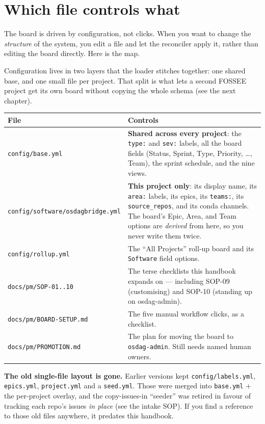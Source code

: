 \documentclass[11pt,a4paper]{report}
\newcommand{\code}[1]{\texttt{#1}}
\begin{document}
\chapter{Which file controls what}

The board is driven by configuration, not clicks. When you want to change the
\emph{structure} of the system, you edit a file and let the reconciler apply it,
rather than editing the board directly. Here is the map.

Configuration lives in two layers that the loader stitches together: one shared
base, and one small file per project. That split is what lets a second FOSSEE
project get its own board without copying the whole schema (see the next chapter).

\begin{center}
\begin{longtable}{@{}p{4.6cm}p{8.6cm}@{}}
\toprule
\textbf{File} & \textbf{Controls} \\
\midrule
\endhead
\code{config/base.yml} & \textbf{Shared across every project}: the \code{type:} and \code{sev:} labels, all the board fields (Status, Sprint, Type, Priority, \ldots, Team), the sprint schedule, and the nine views. \\
\code{config/software/osdagbridge.yml} & \textbf{This project only}: its display name, its \code{area:} labels, its epics, its \code{teams:}, its \code{source\_repos}, and its conda channels. The board's Epic, Area, and Team options are \emph{derived} from here, so you never write them twice. \\
\code{config/rollup.yml} & The ``All Projects'' roll-up board and its \code{Software} field options. \\
\code{docs/pm/SOP-01..10} & The terse checklists this handbook expands on --- including SOP-09 (customising) and SOP-10 (standing up on osdag-admin). \\
\code{docs/pm/BOARD-SETUP.md} & The five manual workflow clicks, as a checklist. \\
\code{docs/pm/PROMOTION.md} & The plan for moving the board to \code{osdag-admin}. Still needs named human owners. \\
\bottomrule
\end{longtable}
\end{center}

\begin{notebox}
\textbf{The old single-file layout is gone.} Earlier versions kept
\code{config/labels.yml}, \code{epics.yml}, \code{project.yml} and a
\code{seed.yml}. Those were merged into \code{base.yml} + the per-project overlay,
and the copy-issues-in ``seeder'' was retired in favour of tracking each repo's
issues \emph{in place} (see the intake SOP). If you find a reference to those old
files anywhere, it predates this handbook.
\end{notebox}
\end{document}
